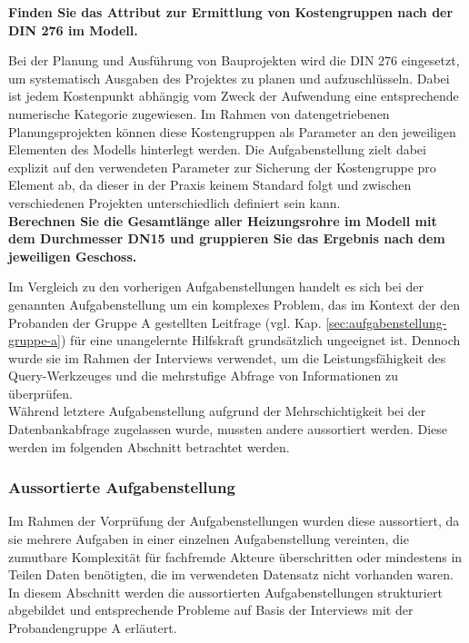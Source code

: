 \textbf{Finden Sie das Attribut zur Ermittlung von Kostengruppen nach der DIN 276 im Modell.}

Bei der Planung und Ausführung von Bauprojekten wird die DIN 276 eingesetzt, um systematisch Ausgaben des Projektes zu planen und aufzuschlüsseln.
Dabei ist jedem Kostenpunkt abhängig vom Zweck der Aufwendung eine entsprechende numerische Kategorie zugewiesen.
Im Rahmen von datengetriebenen Planungsprojekten können diese Kostengruppen als Parameter an den jeweiligen Elementen des Modells hinterlegt werden.
Die Aufgabenstellung zielt dabei explizit auf den verwendeten Parameter zur Sicherung der Kostengruppe pro Element ab, da dieser in der Praxis keinem Standard folgt und zwischen verschiedenen Projekten unterschiedlich definiert sein kann. \\

\textbf{Berechnen Sie die Gesamtlänge aller Heizungsrohre im Modell mit dem Durchmesser DN15 und gruppieren Sie das Ergebnis nach dem jeweiligen Geschoss.}

Im Vergleich zu den vorherigen Aufgabenstellungen handelt es sich bei der genannten Aufgabenstellung um ein komplexes Problem, 
das im Kontext der den Probanden der Gruppe A gestellten Leitfrage (vgl. Kap. \ref{sec:aufgabenstellung-gruppe-a}) für eine unangelernte Hilfskraft grundsätzlich ungeeignet ist.
Dennoch wurde sie im Rahmen der Interviews verwendet, um die Leistungsfähigkeit des Query-Werkzeuges und die mehrstufige Abfrage von Informationen zu überprüfen. \\

Während letztere Aufgabenstellung aufgrund der Mehrschichtigkeit bei der Datenbankabfrage zugelassen wurde, mussten andere aussortiert werden.
Diese werden im folgenden Abschnitt betrachtet werden.

\subsubsection{Aussortierte Aufgabenstellung}
\label{sec:results-group-a-deleted}

Im Rahmen der Vorprüfung der Aufgabenstellungen wurden diese aussortiert, da sie mehrere Aufgaben in einer einzelnen Aufgabenstellung vereinten,
die zumutbare Komplexität für fachfremde Akteure überschritten oder mindestens in Teilen Daten benötigten, die im verwendeten Datensatz nicht vorhanden waren.
In diesem Abschnitt werden die aussortierten Aufgabenstellungen strukturiert abgebildet und entsprechende Probleme auf Basis der Interviews mit der Probandengruppe A erläutert. \\

